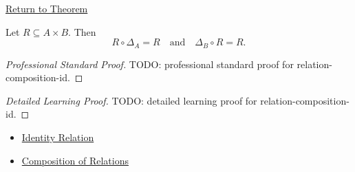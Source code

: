 \newpage
{}
\label{prf:relation-composition-id}

\begin{remark*}[Return]
\hyperref[thm:relation-composition-id]{Return to Theorem}
\end{remark*}

\begin{theorem*}
Let $R\subseteq A\times B$. Then
\[
R\circ\Delta_A=R
\quad\text{and}\quad
\Delta_B\circ R=R.
\]
\end{theorem*}

\begin{proof}[Professional Standard Proof]
\LRAProofBodyStart
TODO: professional standard proof for relation-composition-id.
\end{proof}

\begin{proof}[Detailed Learning Proof]
\LRAProofBodyStart
TODO: detailed learning proof for relation-composition-id.
\end{proof}

\begin{remark*}

\end{remark*}

\begin{dependencies}
\begin{itemize}
  \item \hyperref[def:relation-identity]{Identity Relation}
  \item \hyperref[def:relation-composition]{Composition of Relations}
\end{itemize}
\end{dependencies}

\clearpage
